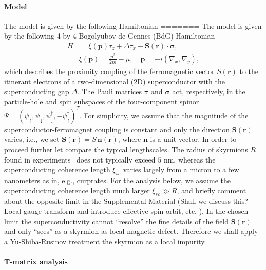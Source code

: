 \documentclass[twocolumn,showpacs,floatfix,nofootinbib,longbibliography]{revtex4-1}
\begin{document}
\paragraph*{Model}  \label{sec:model}
The model is given by the following Hamiltonian
=======
The model is given by the following 4-by-4 Bogolyubov-de Gennes (BdG) Hamiltonian
\begin{align}
	 H &= \xi(\bm p)\tau_z+\Delta \tau_x - \bm S(\bm r)\cdot\bm\sigma, \label{ham} \\
  & \xi(\bm p) = \frac{p^2}{2m}-\mu,\quad \bm p = -i(\nabla_x,\nabla_y),
\end{align}
which describes the proximity coupling of the ferromagnetic vector $S(\bm r)$ to the itinerant electrons of a two-dimensional (2D) superconductor with the superconducting gap $\Delta$. The Pauli matrices $\bm \tau$ and $\bm \sigma$ act, respectively, in the particle-hole and spin subspaces of the four-component spinor $\Psi = (\psi_\uparrow,\psi_\downarrow,\psi^\dagger_\downarrow,-\psi^\dagger_\uparrow)^T$. For simplicity, we assume that the magnitude of the superconductor-ferromagnet coupling is constant and only the direction $\bm S(\bm r)$ varies, i.e., we set $\bm S(\bm r) = S\,\bm n(\bm r)$, where $\bm n$ is a unit vector. In order to proceed further let compare the typical lengthscales. The radius of skyrmions $R$ found in experiments~\cite{Heinze2011,Romming2013,Bergmann2014,Brede2014,Sonntag2014,vonBergmann2015,Romming2015} does not typically exceed $5$ nm, whereas the superconducting coherence length $\xi_{sc}$ varies largely from a micron to a few nanometers as in, e.g., curprates. For the analysis below, we assume the superconducting coherence length much larger $\xi_{sc}\gg R$, and briefly comment about the opposite limit in the Supplemental Material (Shall we discuss this? Local gauge transform and introduce effective spin-orbit, etc. ). In the chosen limit the superconductivity cannot ``resolve'' the fine details of the field $\bm S(\bm r)$ and only ``sees'' as a skyrmion as local magnetic defect. Therefore we shall apply a Yu-Shiba-Rusinov \cite{Yu,Shiba,Rusinov,Balatsky2006} treatment the skyrmion as a local impurity.
\paragraph*{T-matrix analysis} \label{sec:analytics}
\end{document}
